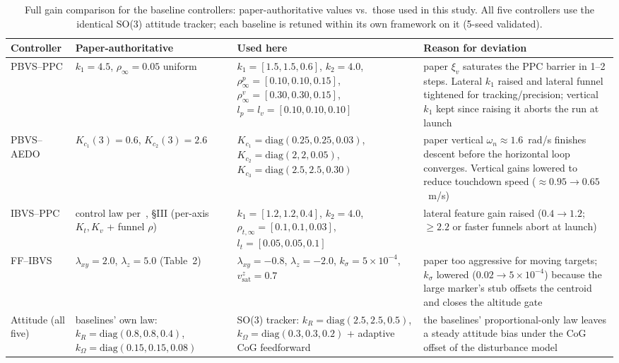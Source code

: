 \documentclass{IEEEtaes}
\theoremstyle{definition}
\theoremstyle{remark}
\begin{document}
\begin{table}[!t]
\centering
\footnotesize
\caption{Full gain comparison for the baseline controllers: paper-authoritative values vs.\ those used in this study. All five controllers use the identical SO(3) attitude tracker; each baseline is retuned within its own framework on it (5-seed validated).}
\label{baseline gains: table}
\begin{tabular}{p{} p{} p{} p{}}
\toprule
\textbf{Controller} & \textbf{Paper-authoritative} & \textbf{Used here} & \textbf{Reason for deviation} \\
\midrule
PBVS--PPC \cite{lin2022} & $k_1{=}4.5$, $\rho_\infty{=}0.05$ uniform & $k_1{=}[1.5,1.5,0.6]$, $k_2{=}4.0$, $\rho_\infty^p{=}[0.10,0.10,0.15]$, $\rho_\infty^v{=}[0.30,0.30,0.15]$, $l_p{=}l_v{=}[0.10,0.10,0.10]$ & paper $\xi_v$ saturates the PPC barrier in 1--2 steps. Lateral $k_1$ raised and lateral funnel tightened for tracking/precision; vertical $k_1$ kept since raising it aborts the run at launch \\
PBVS--AEDO \cite{zhang2026} & $K_{c_1}(3){=}0.6$, $K_{c_2}(3){=}2.6$ & $K_{c_1}{=}\text{diag}(0.25,0.25,0.03)$, $K_{c_2}{=}\text{diag}(2,2,0.05)$, $K_{c_3}{=}\text{diag}(2.5,2.5,0.30)$ & paper vertical $\omega_n{\approx}1.6$~rad/s finishes descent before the horizontal loop converges. Vertical gains lowered to reduce touchdown speed ($\approx0.95\to0.65$~m/s) \\
IBVS--PPC \cite{lin2023} & control law per~\cite{lin2023}, \S III (per-axis $K_t,K_v$ + funnel $\rho$) & $k_1{=}[1.2,1.2,0.4]$, $k_2{=}4.0$, $\rho_{t,\infty}{=}[0.1,0.1,0.03]$, $l_t{=}[0.05,0.05,0.1]$ & lateral feature gain raised ($0.4\to1.2$; $\ge2.2$ or faster funnels abort at launch) \\
FF--IBVS \cite{cho2022} & $\lambda_{xy}{=}2.0$, $\lambda_z{=}5.0$ (Table~2) & $\lambda_{xy}{=}{-}0.8$, $\lambda_z{=}{-}2.0$, $k_\sigma{=}5{\times}10^{-4}$, $v_\text{sat}^z{=}0.7$ & paper too aggressive for moving targets; $k_\sigma$ lowered ($0.02\to5{\times}10^{-4}$) because the large marker's stub offsets the centroid and closes the altitude gate \\
Attitude (all five) & baselines' own law: $k_R{=}\text{diag}(0.8,0.8,0.4)$, $k_\Omega{=}\text{diag}(0.15,0.15,0.08)$ & SO(3) tracker: $k_R{=}\text{diag}(2.5,2.5,0.5)$, $k_\Omega{=}\text{diag}(0.3,0.3,0.2)$ + adaptive CoG feedforward & the baselines' proportional-only law leaves a steady attitude bias under the CoG offset of the disturbance model \\
\bottomrule
\end{tabular}
\end{table}
\end{document}
